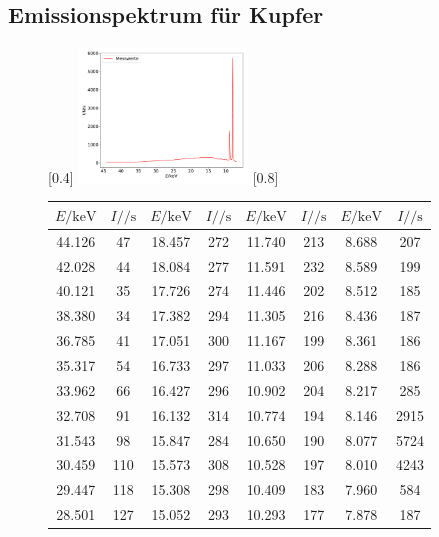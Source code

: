 \subsection{Emissionspektrum für Kupfer}
\begin{figure}
  \centering
  [0.4\textwidth]{
  \includegraphics[width=0.4\textwidth]{emission.pdf}
  }
  \hfill
  [0.8\textwidth]{
    \begin{tabular}{c c | c c | c c | c c}
      \toprule
      $E / \si{\kilo\electronvolt}$ & $I / \si{\per\second}$ & $E / \si{\kilo\electronvolt}$ & $I / \si{\per\second}$ &
      $E / \si{\kilo\electronvolt}$ & $I / \si{\per\second}$ & $E / \si{\kilo\electronvolt}$ & $I / \si{\per\second}$ \\
      \midrule
      44.126 & 47 & 18.457 & 272 & 11.740 & 213 & 8.688 & 207 \\
      42.028 & 44 & 18.084 & 277 & 11.591 & 232 & 8.589 & 199 \\
      40.121 & 35 & 17.726 & 274 & 11.446 & 202 & 8.512 & 185 \\
      38.380 & 34 & 17.382 & 294 & 11.305 & 216 & 8.436 & 187 \\
      36.785 & 41 & 17.051 & 300 & 11.167 & 199 & 8.361 & 186 \\
      35.317 & 54 & 16.733 & 297 & 11.033 & 206 & 8.288 & 186 \\
      33.962 & 66 & 16.427 & 296 & 10.902 & 204 & 8.217 & 285 \\
      32.708 & 91 & 16.132 & 314 & 10.774 & 194 & 8.146 & 2915 \\
      31.543 & 98 & 15.847 & 284 & 10.650 & 190 & 8.077 & 5724 \\
      30.459 & 110 & 15.573 & 308 & 10.528 & 197 & 8.010 & 4243 \\
      29.447 & 118 & 15.308 & 298 & 10.409 & 183 & 7.960 & 584 \\
      28.501 & 127 & 15.052 & 293 & 10.293 & 177 & 7.878 & 187 \\

\end{tabular}}
\end{figure}

